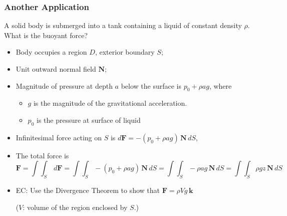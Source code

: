 \begin{frame}
  \frametitle{Another Application}

A solid body is submerged into a tank containing a liquid of constant density $\rho$. What is the buoyant force?

\begin{itemize}
  \item \pause Body occupies a region $D$, exterior boundary $S$;
  \item Unit outward normal field $\textbf{N}$;
  \item \pause Magnitude of pressure at depth $a$ below the surface is $p_0+\rho a g$, where
   \begin{itemize}
     \item $g$ is the magnitude of the gravitational acceleration.
     \item $p_0$ is the pressure at surface of liquid
   \end{itemize}
  \item \pause Infinitesimal force acting on $S$ is $d\textbf{F} = -(p_0+\rho a g) \, \textbf{N} \, dS$,
  \item  \pause The total force is
%
$$\bm{F} = \int\!\!\!\int_S \, d\textbf{F} = \int\!\!\!\int_S -(p_0+\rho a g) \, \textbf{N} \, dS = \int\!\!\!\int_S -\rho a g \, \bm{N}\,dS = \int\!\!\!\int_S \rho g z \, \bm{N}\,dS$$
%
\item \pause EC: Use the Divergence Theorem to show that $\textbf{F} = \rho V g \, \textbf{k}$

    ($V$: volume of the region enclosed by $S$.)

\end{itemize}

\end{frame}

